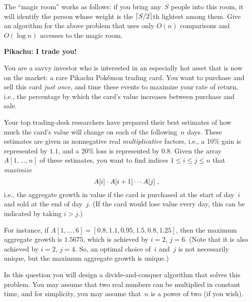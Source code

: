 \documentclass[11pt,addpoints]{exam}
\begin{document}
\begin{questions}
  The ``magic room'' works as follows: if you bring any~$S$ people into this room, it will identify the person whose weight is the $\lceil S/2\rceil$th lightest among them.
  Give an algorithm for the above problem that uses only $O(n)$ comparisons and $O(\log n)$ accesses to the magic room.

  \begin{solution}

  \end{solution}

  \question \textbf{Pikachu: I trade you!}
  
  You are a savvy investor who is interested in an especially hot asset that is now on the market: a rare Pikachu Pok{\'e}mon trading card.
  You want to purchase and sell this card \emph{just once}, and time these events to maximize your rate of return, i.e., the percentage by which the card's value increases between purchase and sale.

  Your top trading-desk researchers have prepared their best estimates of how much the card's value will change on each of the following~$n$ days.
  These estimates are given as nonnegative real \emph{multiplicative} factors, i.e., a 10\% gain is represented by $1.1$, and a 20\% loss is represented by $0.8$.
  Given the array $A[1,\ldots,n]$ of these estimates, you want to find indices $1 \leq i \leq j \leq n$ that \emph{maximize} \[ A[i] \cdot A[i+1] \cdots A[j] \; \text, \] i.e., the aggregate growth in value if the card is purchased at the start of day~$i$ and sold at the end of day~$j$.
  (If the card would lose value every day, this can be indicated by taking $i > j$.)
      
  For instance, if $A[1, \ldots, 6] = [0.8, 1.1, 0.95, 1.5, 0.8, 1.25]$, then the maximum aggregate growth is $1.5675$, which is achieved by $i=2$, $j=6$.
  (Note that it is also achieved by $i=2$, $j=4$.
  So, an optimal choice of~$i$ and~$j$ is not necessarily unique, but the maximum aggregate growth is unique.)
    
  In this question you will design a divide-and-conquer algorithm that solves this problem.
  You may assume that two real numbers can be multiplied in constant time, and for simplicity, you may assume that~$n$ is a power of two (if you wish).
  
\end{questions}
\end{document}
